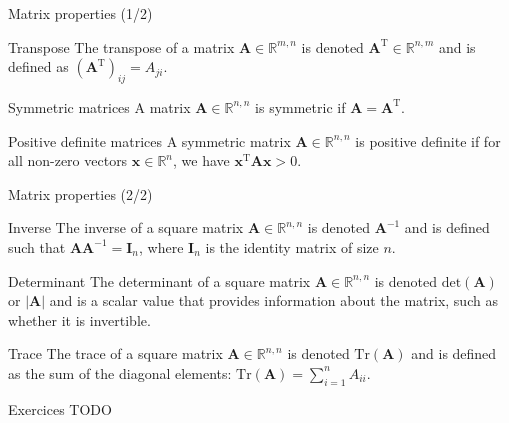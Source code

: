 \documentclass[aspectratio=1610]{beamer}
\begin{document}
\begin{frame}{Matrix properties (1/2)}

  \begin{block}{Transpose}
    The transpose of a matrix $\mathbf{A}\in\mathbb{R}^{m,n}$ is denoted $\mathbf{A}^\mathrm{T}\in\mathbb{R}^{n,m}$ and is defined as $(\mathbf{A}^\mathrm{T})_{ij} = A_{ji}$.
  \end{block}

  \begin{block}{Symmetric matrices}
    A matrix $\mathbf{A}\in\mathbb{R}^{n,n}$ is symmetric if $\mathbf{A} = \mathbf{A}^\mathrm{T}$.
  \end{block}

  \begin{block}{Positive definite matrices}
    A symmetric matrix $\mathbf{A}\in\mathbb{R}^{n,n}$ is positive definite if for all non-zero vectors $\mathbf{x}\in\mathbb{R}^n$, we have $\mathbf{x}^\mathrm{T}\mathbf{A}\mathbf{x} > 0$.
  \end{block}
\end{frame}

\begin{frame}{Matrix properties (2/2)}

  \begin{block}{Inverse}
    The inverse of a square matrix $\mathbf{A}\in\mathbb{R}^{n,n}$ is denoted $\mathbf{A}^{-1}$ and is defined such that $\mathbf{A}\mathbf{A}^{-1} = \mathbf{I}_n$, where $\mathbf{I}_n$ is the identity matrix of size $n$.
  \end{block}

  \begin{block}{Determinant}
    The determinant of a square matrix $\mathbf{A}\in\mathbb{R}^{n,n}$ is denoted $\mathrm{det}(\mathbf{A})$ or $|\mathbf{A}|$ and is a scalar value that provides information about the matrix, such as whether it is invertible.
  \end{block}

  \begin{block}{Trace}
    The trace of a square matrix $\mathbf{A}\in\mathbb{R}^{n,n}$ is denoted $\mathrm{Tr}(\mathbf{A})$ and is defined as the sum of the diagonal elements: $\mathrm{Tr}(\mathbf{A}) = \sum_{i=1}^n A_{ii}$.
  \end{block}

\end{frame}


\begin{frame}{Exercices}
  TODO
\end{frame}
\end{document}
